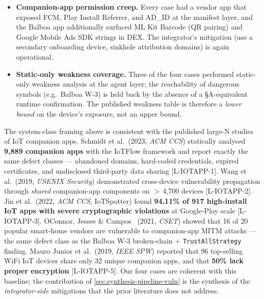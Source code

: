 \documentclass[11pt,a4paper]{article}
\begin{document}
\begin{itemize}
        this pattern.
  \item \textbf{Companion-app permission creep.} Every case had a
        vendor app that exposed FCM, Play Install Referrer, and AD\_ID
        at the manifest layer, and the Balboa app additionally surfaced
        ML Kit Barcode (QR pairing) and Google Mobile Ads SDK strings
        in DEX. The integrator's mitigation (use a secondary onboarding
        device, sinkhole attribution domains) is again operational.
  \item \textbf{Static-only weakness coverage.} Three of the four cases
        performed static-only weakness analysis at the agent layer; the
        reachability of dangerous symbols (e.g.\ Balboa W-3) is held
        back by the absence of a \S{}A-equivalent runtime confirmation.
        The published weakness table is therefore a \emph{lower bound}
        on the device's exposure, not an upper bound.
\end{itemize}

The system-class framing above is consistent with the published large-N
studies of IoT companion apps. Schmidt et al.\ (2023, \emph{ACM CCS})
statically analysed \textbf{9{,}889 companion apps} with the IoTFlow
framework and report exactly the same defect classes --- abandoned
domains, hard-coded credentials, expired certificates, and undisclosed
third-party data sharing [L-IOTAPP-1]. Wang et al.\ (2019, \emph{USENIX
Security}) demonstrated cross-device vulnerability propagation through
\emph{shared} companion-app components on $>$\,4{,}700 devices
[L-IOTAPP-2]. Jin et al.\ (2022, \emph{ACM CCS}, IoTSpotter) found
\textbf{94.11\% of 917 high-install IoT apps with severe cryptographic
violations} at Google-Play scale [L-IOTAPP-3]. OConnor, Jessee \&
Campos~\citep{oconnor2021homealone} (2021, \emph{CSET}) showed that 16
of 20 popular smart-home vendors are vulnerable to companion-app MITM
attacks --- the same defect class as the Balboa W-3 broken-chain +
\texttt{TrustAllStrategy} finding. Mauro Junior et al.\ (2019, \emph{IEEE SPW}) reported that
96 top-selling WiFi IoT devices share only 32 unique companion apps,
and that \textbf{50\% lack proper encryption} [L-IOTAPP-5]. Our four
cases are coherent with this baseline; the contribution of
\cref{sec:synthesis-pipeline-vuln} is the synthesis of the
\emph{integrator-side} mitigations that the prior literature does not
address.
\end{document}
